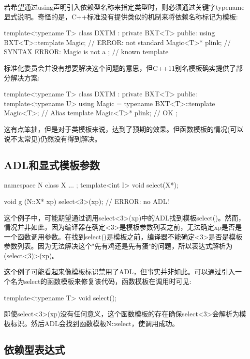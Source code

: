 若希望通过using声明引入依赖型名称来指定类型时，则必须通过关键字typename显式说明。奇怪的是，C++标准没有提供类似的机制来将依赖名称标记为模板:

\begin{cpp}
template<typename T>
class DXTM : private BXT<T> {
	public:
	using BXT<T>::template Magic; // ERROR: not standard
	Magic<T>* plink; // SYNTAX ERROR: Magic is not a
}; // known template
\end{cpp}

标准化委员会并没有想要解决这个问题的意思，但C++11别名模板确实提供了部分解决方案:

\begin{cpp}
template<typename T>
class DXTM : private BXT<T> {
	public:
	template<typename U>
		using Magic = typename BXT<T>::template Magic<T>; // Alias template
	Magic<T>* plink; // OK
};
\end{cpp}

这有点笨拙，但是对于类模板来说，达到了预期的效果。但函数模板的情况(可以说不太常见)仍然没有得到解决。

\subsection{ADL和显式模板参数}

\begin{cpp}
namespace N {
	class X {
		...
	};
	template<int I> void select(X*);
}

void g (N::X* xp)
{
	select<3>(xp); // ERROR: no ADL!
}
\end{cpp}

这个例子中，可能期望通过调用select<3>(xp)中的ADL找到模板select()。然而，情况并非如此，因为编译器在确定<3>是模板参数列表之前，无法确定xp是否是一个函数调用参数。在找到select()是模板之前，编译器不能确定<3>是否是模板参数列表。因为无法解决这个"先有鸡还是先有蛋"的问题，所以表达式解析为(select<3)>(xp)。

这个例子可能看起来像模板标识禁用了ADL，但事实并非如此。可以通过引入一个名为select的函数模板来修复该代码，函数模板在调用时可见:

\begin{cpp}
template<typename T> void select();
\end{cpp}

即使select<3>(xp)没有任何意义，这个函数模板的存在确保select<3>会解析为模板标识。然后ADL会找到函数模板N::select，使调用成功。

\subsection{依赖型表达式}

